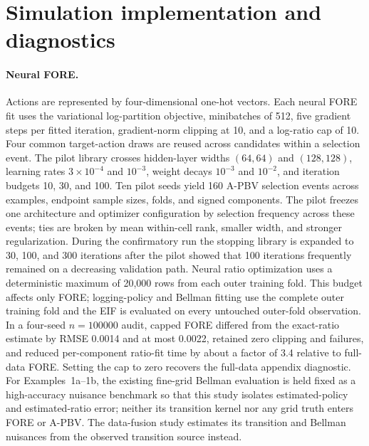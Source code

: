 \documentclass[11pt]{article}
\theoremstyle{plain}
\begin{document}
\section{Simulation implementation and diagnostics}
\label{app::normsim}

\paragraph{Neural FORE.}
Actions are represented by four-dimensional one-hot vectors. Each neural FORE
fit uses the variational log-partition objective, minibatches of 512, five
gradient steps per fitted iteration, gradient-norm clipping at 10, and a
log-ratio cap of 10. Four common target-action draws are reused across candidates
within a selection event. The pilot library crosses hidden-layer widths
$(64,64)$ and $(128,128)$, learning rates $3\times10^{-4}$ and $10^{-3}$,
weight decays $10^{-3}$ and $10^{-2}$, and iteration budgets 10, 30, and 100.
Ten pilot seeds yield 160 A-PBV selection events across examples, endpoint
sample sizes, folds, and signed components. The pilot freezes one architecture
and optimizer configuration by selection frequency across these events; ties are broken by
mean within-cell rank, smaller width, and stronger regularization. During the
confirmatory run the stopping library is expanded to 30, 100, and 300 iterations
after the pilot showed that 100 iterations frequently remained on a decreasing
validation path. Neural ratio optimization uses a deterministic maximum of
20,000 rows from each outer training fold. This budget affects only FORE;
logging-policy and Bellman fitting use the complete outer training fold and the
EIF is evaluated on every untouched outer-fold observation. In a four-seed
$n=100000$ audit, capped FORE differed from the exact-ratio estimate by RMSE
0.0014 and at most 0.0022, retained zero clipping and failures, and reduced
per-component ratio-fit time by about a factor of 3.4 relative to full-data
FORE. Setting the cap to zero recovers the full-data appendix diagnostic.
For Examples~1a--1b, the existing fine-grid Bellman evaluation
is held fixed as a high-accuracy nuisance benchmark so that this study isolates
estimated-policy and estimated-ratio error; neither its transition kernel nor
any grid truth enters FORE or A-PBV.
The data-fusion study estimates its transition and Bellman nuisances from the
observed transition source instead.
\end{document}

